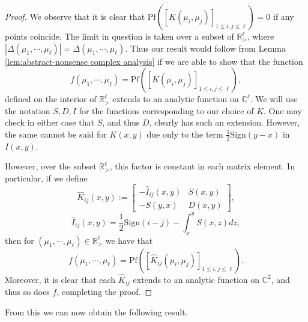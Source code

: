 \documentclass[12pt]{article}
\newcommand{\R}{\mathbb{R}}
\newcommand{\C}{\mathbb{C}}
\numberwithin{info}{section}
\numberwithin{equation}{section}
\renewcommand{\[}{\begin{equation}}
\renewcommand{\]}{\end{equation}}
\newcommand{\sign}{\mathrm{Sign}}
\newcommand{\<}{\langle}
\renewcommand{\>}{\rangle}
\newcommand{\pf}{\mathrm{Pf}}
\begin{document}
	\begin{proof}
		We observe that it is clear that $\pf([K(\mu_i,\mu_j)]_{1\le i,j\le \ell})=0$ if any points coincide.
		The limit in question is taken over a subset of $\R^{\ell}_{> }$, where $|\Delta(\mu_1,\cdots,\mu_\ell)|=\Delta(\mu_1,\cdots,\mu_\ell)$. Thus our result would follow from Lemma \ref{lem:abstract-nonsense complex analysis} if we are able to show that the function \[f(\mu_1,\cdots,\mu_\ell)=\pf([K(\mu_i,\mu_j)]_{1\le i,j\le \ell}),\]
		defined on the interior of $\R^\ell_{>}$ extends to an analytic function on $\C^\ell$. We will use the notation $S,D,I$ for the functions corresponding to our choice of $K$. One may check in either case that $S$, and thus $D$, clearly has such an extension. However, the same cannot be said for $K(x,y)$ due only to the term $\frac{1}{2}\sign(y-x)$ in $I(x,y)$. 
		
		However, over the subset $\R^\ell_{>}$, this factor is constant in each matrix element. In particular, if we define
		\[\hat{K}_{ij}(x,y):=\begin{bmatrix}
			-\hat{I}_{ij}(x,y)& S(x,y)\\
			-S(y,x)& D(x,y)
		\end{bmatrix},\label{eqn:ignore-352}\]
		\[\hat{I}_{ij}(x,y)=\frac{1}{2}\sign(i-j)-\int_x^y S(x,z)dz,\]
		then for $(\mu_1,\cdots,\mu_\ell)\in \R^\ell_{>}$ we have that
		\[f(\mu_1,\cdots,\mu_\ell)=\pf([\hat{K}_{ij}(\mu_i,\mu_j)]_{1\le i,j\le \ell}).\]
		Moreover, it is clear that each $\hat{K}_{ij}$ extends to an analytic function on $\C^2$, and thus so does $f$, completing the proof.
	\end{proof}	
	
	From this we can now obtain the following result.
	
\end{document}
